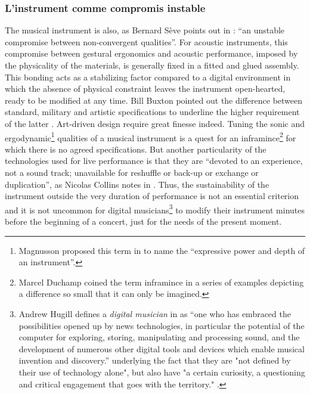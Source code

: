 \subsubsection{L'instrument comme compromis instable}
The musical instrument is also, as Bernard Sève points out in \cite{seve_instrument_2013}: “an unstable compromise between non-convergent qualities”. For acoustic instruments, this compromise between gestural ergonomics and acoustic performance, imposed by the physicality of the materials, is generally fixed in a fitted and glued assembly. This bonding acts as a stabilizing factor compared to a digital environment in which the absence of physical constraint leaves the instrument open-hearted, ready to be modified at any time.
	Bill Buxton pointed out the difference between standard, military and artistic specifications to underline the higher requirement of the latter \cite{buxton_artists_1997}. Art-driven design require great finesse indeed. Tuning the sonic and ergodynamic\footnote{Magnusson proposed this term in \cite{magnusson_ergodynamics_2019} to name the “expressive power and depth of an instrument”.} qualities of a musical instrument is a quest for an inframince\footnote{Marcel Duchamp \cite{duchamp_notes_2008} coined the term inframince in a series of examples depicting a difference so small that it can only be imagined.} for which there is no agreed specifications. But another particularity of the technologies used for live performance is that they are “devoted to an experience, not a sound track; unavailable for reshuffle or back-up or exchange or duplication”, as Nicolas Collins notes in \cite{collins_semiconducting_2013}.
	Thus, the sustainability of the instrument outside the very duration of performance is not an essential criterion and it is not uncommon for digital musicians\footnote{Andrew Hugill defines a \textit{digital musician} in \cite{hugill_digital_2019} as “one who has embraced the possibilities opened up by news technologies, in particular the potential of the computer for exploring, storing, manipulating and processing sound, and the development of numerous other digital tools and devices which enable musical invention and discovery.” underlying the fact that they are "not defined by their use of technology alone", but also have "a certain curiosity, a questioning and critical engagement that goes with the territory." .} to modify their instrument minutes before the beginning of a concert, just for the needs of the present moment.
	
